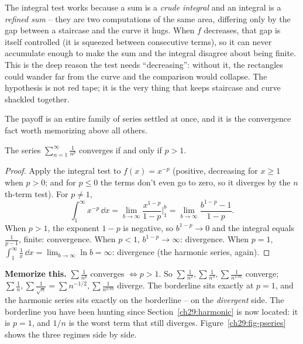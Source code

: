 \begin{whybox}
The integral test works because a sum is a \emph{crude integral} and an integral is a \emph{refined sum} -- they are two computations of the same area, differing only by the gap between a staircase and the curve it hugs. When $f$ decreases, that gap is itself controlled (it is squeezed between consecutive terms), so it can never accumulate enough to make the sum and the integral disagree about being finite. This is the deep reason the test needs ``decreasing'': without it, the rectangles could wander far from the curve and the comparison would collapse. The hypothesis is not red tape; it is the very thing that keeps staircase and curve shackled together.
\end{whybox}

The payoff is an entire family of series settled at once, and it is the convergence fact worth memorizing above all others.

\begin{theorem}
\label{ch29:thm-pseries}
The series $\displaystyle\sum_{n=1}^{\infty} \frac{1}{n^p}$ converges if and only if $p > 1$.
\end{theorem}

\begin{proof}
Apply the integral test to $f(x)=x^{-p}$ (positive, decreasing for $x\ge 1$ when $p>0$; and for $p\le 0$ the terms don't even go to zero, so it diverges by the $n$th-term test). For $p \ne 1$,
\[
\int_1^{\infty} x^{-p}\,\dd x = \lim_{b\to\infty} \frac{x^{1-p}}{1-p}\Big|_1^{b} = \lim_{b\to\infty}\frac{b^{1-p}-1}{1-p}.
\]
When $p>1$, the exponent $1-p$ is negative, so $b^{1-p}\to 0$ and the integral equals $\tfrac{1}{p-1}$, finite: convergence. When $p<1$, $b^{1-p}\to\infty$: divergence. When $p=1$, $\int_1^\infty \tfrac1x\,\dd x = \lim_{b\to\infty}\ln b = \infty$: divergence (the harmonic series, again).
\end{proof}

\begin{focusbox}
\textbf{Memorize this.} $\sum \tfrac{1}{n^p}$ converges $\iff p > 1$. So $\sum\tfrac1{n^2}, \sum\tfrac1{n^3}, \sum\tfrac{1}{n^{1.01}}$ converge; $\sum\tfrac1n, \sum\tfrac{1}{\sqrt n}=\sum n^{-1/2}, \sum\tfrac{1}{n^{0.99}}$ diverge. The borderline sits exactly at $p=1$, and the harmonic series sits exactly on the borderline -- on the \emph{divergent} side. The borderline you have been hunting since Section~\ref{ch29:harmonic} is now located: it is $p=1$, and $1/n$ is the worst term that still diverges. Figure~\ref{ch29:fig-pseries} shows the three regimes side by side.
\end{focusbox}

